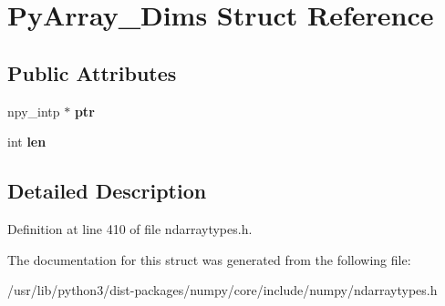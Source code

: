 \hypertarget{structPyArray__Dims}{}\section{Py\+Array\+\_\+\+Dims Struct Reference}
\label{structPyArray__Dims}
\subsection*{Public Attributes}
\begin{DoxyCompactItemize}
\item 
npy\+\_\+intp $\ast$ {\bfseries ptr}\hypertarget{structPyArray__Dims_ad53eb94060037c67f1ef56965056b63d}{}\label{structPyArray__Dims_ad53eb94060037c67f1ef56965056b63d}

\item 
int {\bfseries len}\hypertarget{structPyArray__Dims_ae18cd0947ce2f07b62f6d0e67f5620f5}{}\label{structPyArray__Dims_ae18cd0947ce2f07b62f6d0e67f5620f5}

\end{DoxyCompactItemize}


\subsection{Detailed Description}


Definition at line 410 of file ndarraytypes.\+h.



The documentation for this struct was generated from the following file\+:\begin{DoxyCompactItemize}
\item 
/usr/lib/python3/dist-\/packages/numpy/core/include/numpy/ndarraytypes.\+h\end{DoxyCompactItemize}
